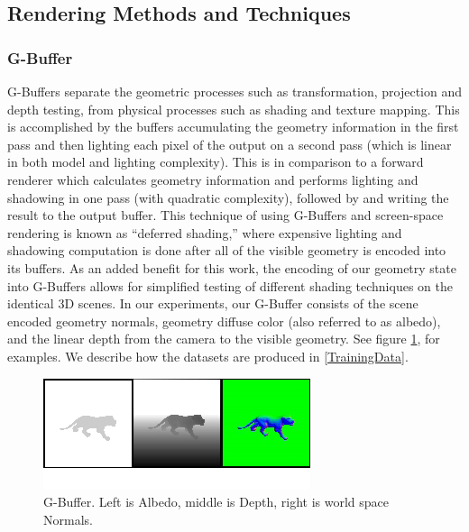 \documentclass[10pt,twocolumn,letterpaper]{article}
\begin{document}

\subsection{Rendering Methods and Techniques}

\subsubsection{G-Buffer}

G-Buffers \cite{Saito:1990:CRS:97879.97901} separate the geometric processes such as transformation, projection and depth testing, from physical processes such as shading and texture mapping. This is accomplished by the buffers accumulating the geometry information in the first pass and then lighting each pixel of the output on a second pass (which is linear in both model and lighting complexity).  This is in comparison to a forward renderer which calculates geometry information and performs lighting and shadowing in one pass (with quadratic complexity), followed by and writing the result to the output buffer. This technique of using G-Buffers and screen-space rendering is known as ``deferred shading,'' where expensive lighting and shadowing computation is done after all of the visible geometry is encoded into its buffers.
 As an added benefit for this work, the encoding of our geometry state into G-Buffers allows for simplified testing of different shading techniques on the identical 3D scenes.
In our experiments, our G-Buffer consists of the scene encoded geometry normals, geometry diffuse color (also referred to as albedo), and the linear depth from the camera to the visible geometry.  See figure \ref{fig:GBUFFER_ALBEDO}, for examples. We describe how the datasets are produced in \ref{TrainingData}.

\begin{figure}[h!]
\centering
\includegraphics[width=0.8\columnwidth]{./assets/gbuffer-onerow.png}
\caption{G-Buffer. Left is Albedo, middle is Depth, right is world space Normals.}
\label{fig:GBUFFER_ALBEDO} 
\end{figure}
\end{document}
